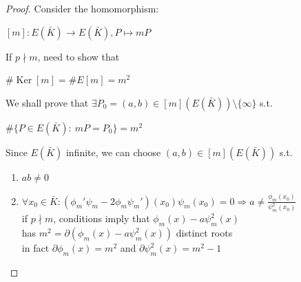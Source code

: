 \documentclass[10pt,handout]{beamer} %
\begin{document}
\begin{frame}

\begin{proof} Consider the homomorphism:\\
\centerline{\alert{$[m]:E(\bar{K})\rightarrow E(\bar{K}), P\mapsto mP$}}\pause

If $p\nmid m$, need to show that \\
\centerline{\alert{$\#\operatorname{Ker}[m]=\#E[m]=m^2$}}\pause
\medskip

We shall prove that
$\exists P_0=(a,b)\in [m](E(\bar{K}))\setminus\{\infty\}$ s.t.\\
\centerline{\alert{$\#\{P\in E(\bar{K}):\ mP=P_0\}=m^2$}}\pause
\medskip

Since $E(\bar{K})$ infinite, we can choose $(a,b)\in [m](E(\bar{K}))$ s.t. %
\begin{enumerate}[<+->]
  \item \alert{$ab\neq0$}
  \item \alert{$\forall x_0\in\bar{K}:
(\phi_m'\psi_m-2\phi_m\psi_m')(x_0)\psi_m(x_0)=0\Rightarrow a\ne \frac{\phi_{m}(x_0)}{\psi_{m}^{2}(x_0)}$}\\
\qquad if $p\nmid m$, conditions imply that \alert{$\phi_m(x)-a\psi_m^2(x)$}\\ \qquad has
$m^2=\partial(\phi_m(x)-a\psi_m^2(x))$ distinct roots\\
\qquad in fact $\partial \phi_m(x)=m^2$ and $\partial\psi_m^2(x)=m^2-1$\vspace*{-5mm}
\end{enumerate}
\end{proof}
\end{frame}
\end{document}
